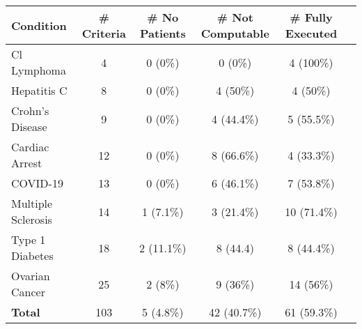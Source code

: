 \def\arraystretch{1.4}
\begin{tabular}{l c c c c c}
    \textbf{Condition} & \textbf{\# Criteria} & \textbf{\# No Patients} & \textbf{\# Not Computable} & \textbf{\# Fully Executed} \\
    \toprule
    Cl Lymphoma        & 4  & 0 (0\%)    & 0 (0\%)    & 4  (100\%)  \\
    Hepatitis C        & 8  & 0 (0\%)    & 4 (50\%)   & 4  (50\%)   \\
    Crohn's Disease    & 9  & 0 (0\%)    & 4 (44.4\%) & 5  (55.5\%) \\
    Cardiac Arrest     & 12 & 0 (0\%)    & 8 (66.6\%) & 4  (33.3\%) \\
    COVID-19           & 13 & 0 (0\%)    & 6 (46.1\%) & 7  (53.8\%) \\
    Multiple Sclerosis & 14 & 1 (7.1\%)  & 3 (21.4\%) & 10 (71.4\%) \\
    Type 1 Diabetes    & 18 & 2 (11.1\%) & 8 (44.4)   & 8  (44.4\%) \\
    Ovarian Cancer     & 25 & 2 (8\%)    & 9 (36\%)   & 14 (56\%)   \\
    \bottomrule
    \textbf{Total}     & 103 & 5 (4.8\%) & 42 (40.7\%) & 61 (59.3\%)
\end{tabular}
